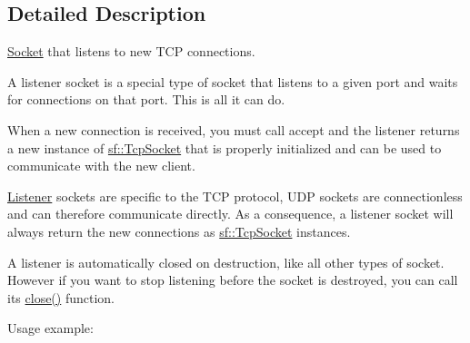 \subsection{Detailed Description}
\mbox{\hyperlink{classsf_1_1_socket}{Socket}} that listens to new T\+CP connections. 

\begin{DoxyVerb}\end{DoxyVerb}


A listener socket is a special type of socket that listens to a given port and waits for connections on that port. This is all it can do.

When a new connection is received, you must call accept and the listener returns a new instance of \mbox{\hyperlink{classsf_1_1_tcp_socket}{sf\+::\+Tcp\+Socket}} that is properly initialized and can be used to communicate with the new client.

\mbox{\hyperlink{classsf_1_1_listener}{Listener}} sockets are specific to the T\+CP protocol, U\+DP sockets are connectionless and can therefore communicate directly. As a consequence, a listener socket will always return the new connections as \mbox{\hyperlink{classsf_1_1_tcp_socket}{sf\+::\+Tcp\+Socket}} instances.

A listener is automatically closed on destruction, like all other types of socket. However if you want to stop listening before the socket is destroyed, you can call its \mbox{\hyperlink{classsf_1_1_tcp_listener_a3a00a850506bd0f9f48867a0fe59556b}{close()}} function.

Usage example\+: 
\begin{DoxyCode}{0}
\DoxyCodeLine{\textcolor{comment}{// Create a listener socket and make it wait for new}}
\DoxyCodeLine{\textcolor{comment}{// connections on port 55001}}
\DoxyCodeLine{}
\DoxyCodeLine{\textcolor{comment}{// Endless loop that waits for new connections}}
\DoxyCodeLine{\{}
\DoxyCodeLine{    \{}
\DoxyCodeLine{        \textcolor{comment}{// A new client just connected!}}
\DoxyCodeLine{    \}}
\DoxyCodeLine{\}}
\end{DoxyCode}



